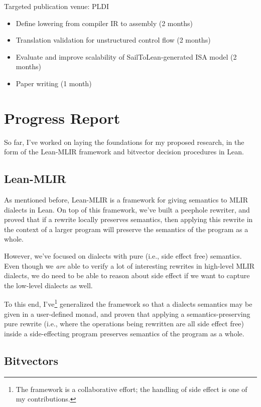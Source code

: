 \documentclass[a4paper]{scrartcl}
\begin{document}
Targeted publication venue: PLDI

\begin{itemize}
\item
  Define lowering from compiler IR to assembly (2 months)
\item
  Translation validation for unstructured control flow (2 months)
\item
  Evaluate and improve scalability of SailToLean-generated ISA model (2
  months)
\item
  Paper writing (1 month)
\end{itemize}



\section{Progress Report}\label{progress-report}

So far, I've worked on laying the foundations for my proposed research, in the form of the Lean-MLIR framework and bitvector decision procedures in Lean.


\subsection{Lean-MLIR}\label{lean-mlir}

As mentioned before, Lean-MLIR is a framework for giving semantics to MLIR dialects in Lean.
On top of this framework, we've built a peephole rewriter, and proved
that if a rewrite locally preserves semantics, then applying this
rewrite in the context of a larger program will preserve the semantics
of the program as a whole.

However, we've focused on dialects with pure (i.e., side effect free)
semantics. Even though we \emph{are} able to verify a lot of interesting
rewrites in high-level MLIR dialects, we do need to be able to reason
about side effect if we want to capture the low-level dialects as well.

To this end, I've\footnote{The framework is a collaborative effort; the handling of side effect is one of my contributions.} generalized the framework so that a dialects
semantics may be given in a user-defined monad, and proven that applying
a semantics-preserving pure rewrite (i.e., where the operations being
rewritten are all side effect free) inside a side-effecting program
preserves semantics of the program as a whole. 


\subsection{Bitvectors}\label{bitvectors}
\end{document}
